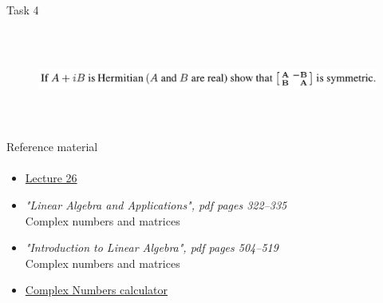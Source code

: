 \documentclass[aspectratio=169]{beamer}
\newcommand{\fbckg}[1]{\usebackgroundtemplate{\texttt{[image: \#1]}}}%
\begin{document}
\begin{frame}[t]{Task 4}
    \framesubtitle{}
    \begin{figure}[H]
        \centering\includegraphics[height=3cm,width=1\textwidth,keepaspectratio]{4.png}
        \label{fig:4.png}
    \end{figure}
\end{frame}

\begin{frame}[t]{Reference material}
    \framesubtitle{}
    \Large
    \begin{itemize}
        \item \href{https://www.youtube.com/watch?v=Y_Ac6KiQ1t0&list=PL49CF3715CB9EF31D&index=27}{Lecture 26}
        \item \textit{"Linear Algebra and Applications", pdf pages 322--335 }\\ Complex numbers and matrices
        \item \textit{"Introduction to Linear Algebra", pdf pages 504--519 }\\ Complex numbers and matrices
        \item \href{https://programforyou.ru/calculators/complex-calculator}{Complex Numbers calculator}
    \end{itemize}
\end{frame}

\fbckg{fibeamer/figs/last_page.png}
\frame[plain]{}
\end{document}
